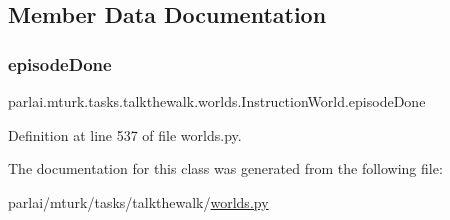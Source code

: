 \subsection{Member Data Documentation}
\mbox{\label{classparlai_1_1mturk_1_1tasks_1_1talkthewalk_1_1worlds_1_1InstructionWorld_aaf59ed0ca8d4a2078e0e312279e5e646}} 
\subsubsection{\texorpdfstring{episode\+Done}{episodeDone}}
{\footnotesize\ttfamily parlai.\+mturk.\+tasks.\+talkthewalk.\+worlds.\+Instruction\+World.\+episode\+Done}



Definition at line 537 of file worlds.\+py.



The documentation for this class was generated from the following file\+:\begin{DoxyCompactItemize}
\item 
parlai/mturk/tasks/talkthewalk/\hyperlink{parlai_2mturk_2tasks_2talkthewalk_2worlds_8py}{worlds.\+py}\end{DoxyCompactItemize}
